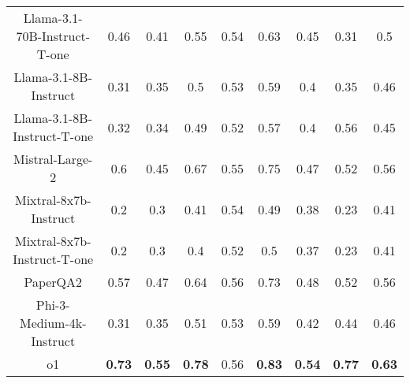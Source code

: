 \begin{tabular}{ccccccccc}
Llama-3.1-70B-Instruct-T-one & 0.46 & 0.41 & 0.55 & 0.54 & 0.63 & 0.45 & 0.31 & 0.5 \\
Llama-3.1-8B-Instruct & 0.31 & 0.35 & 0.5 & 0.53 & 0.59 & 0.4 & 0.35 & 0.46 \\
Llama-3.1-8B-Instruct-T-one & 0.32 & 0.34 & 0.49 & 0.52 & 0.57 & 0.4 & 0.56 & 0.45 \\
Mistral-Large-2 & 0.6 & 0.45 & 0.67 & 0.55 & 0.75 & 0.47 & 0.52 & 0.56 \\
Mixtral-8x7b-Instruct & 0.2 & 0.3 & 0.41 & 0.54 & 0.49 & 0.38 & 0.23 & 0.41 \\
Mixtral-8x7b-Instruct-T-one & 0.2 & 0.3 & 0.4 & 0.52 & 0.5 & 0.37 & 0.23 & 0.41 \\
PaperQA2 & 0.57 & 0.47 & 0.64 & 0.56 & 0.73 & 0.48 & 0.52 & 0.56 \\
Phi-3-Medium-4k-Instruct & 0.31 & 0.35 & 0.51 & 0.53 & 0.59 & 0.42 & 0.44 & 0.46 \\
o1 & \textbf{0.73} & \textbf{0.55} & \textbf{0.78} & 0.56 & \textbf{0.83} & \textbf{0.54} & \textbf{0.77} & \textbf{0.63} \\
\bottomrule
\end{tabular}
